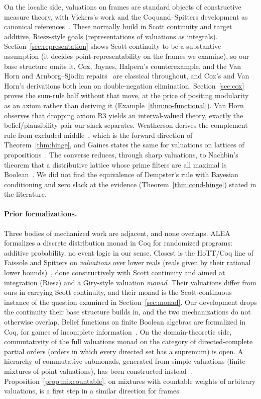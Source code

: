 On the localic
side, valuations on
frames are standard objects of constructive measure theory, with
Vickers's work and the Coquand--Spitters development as canonical
references~\cite{vickers2008,coquand-spitters2009}.  These normally
build in Scott continuity and target additive, Riesz-style goals
(representations of valuations as integrals).
Section~\ref{sec:representation} shows Scott continuity to be a
substantive assumption (it decides point-representability on the
frames we examine), so our base structure omits it.  Cox, Jaynes,
Halpern's counterexample, and the Van Horn and Arnborg--Sj\"odin
repairs~\cite{cox1946,jaynes2003,halpern1999,vanhorn2003,
arnborg-sjodin2000} are classical throughout, and Cox's and Van
Horn's derivations both lean on double-negation elimination.
Section~\ref{sec:cox} proves
the sum-rule half without that move, at the price of positing
modularity as an axiom rather than deriving it
(Example~\ref{thm:no-functional}).  Van Horn observes
that dropping axiom R3 yields an interval-valued theory, exactly the
belief/plausibility pair our slack separates.  Weatherson derives the
complement rule from excluded middle~\cite{weatherson2003}, which is the
forward direction of Theorem~\ref{thm:hinge}, and Gaines states the same
for valuations on lattices of propositions~\cite{gaines1978}. The
converse reduces, through sharp valuations, to Nachbin's theorem that a
distributive lattice whose prime filters are all maximal is
Boolean~\cite{nachbin1947}. We did not find the equivalence of
Dempster's rule with Bayesian conditioning and zero slack at the evidence
(Theorem~\ref{thm:cond-hinge}) stated in the literature.

\paragraph{Prior formalizations.}
Three bodies of mechanized work are adjacent, and none overlaps.
ALEA~\cite{audebaud-paulin2009} formalizes a discrete distribution
monad in Coq for randomized programs: additive probability, no
event logic in our sense.  Closest is the
HoTT/Coq line of Faissole and Spitters on \emph{valuations} over
lower reals (reals given by their rational lower
bounds)~\cite{faissole-spitters2017,bidlingmaier2021}, done constructively with
Scott continuity and aimed at integration (Riesz) and a Giry-style
valuation \emph{monad}.  Their valuations differ from ours in
carrying Scott continuity, and their monad is the Scott-continuous
instance of the question examined in
Section~\ref{sec:monad}.  Our development drops the continuity
their base structure builds in, and the two mechanizations do not
otherwise overlap. Belief functions on finite Boolean algebras are
formalized in Coq, for games of incomplete information~\cite{pomeret2023}.
On the domain-theoretic side, commutativity of
the full valuations monad on the category of directed-complete
partial orders (orders in which every directed set has a supremum) is
open.  A hierarchy of commutative submonads,
generated from simple valuations (finite mixtures of point
valuations), has been constructed
instead~\cite{jia2021commutative}.  
Proposition~\ref{prop:mixcountable}, on mixtures with countable weights
of arbitrary valuations, is a first step in a similar direction for
frames.


